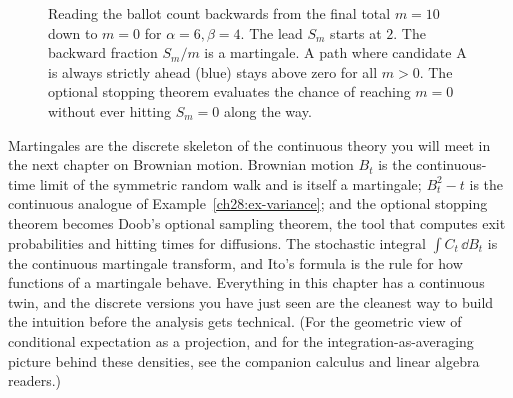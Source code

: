 \begin{figure}[H]
\centering
{}
\caption{Reading the ballot count backwards from the final total $m=10$ down to $m=0$ for $\alpha=6, \beta=4$. The lead $S_m$ starts at $2$. The backward fraction $S_m / m$ is a martingale. A path where candidate A is always strictly ahead (blue) stays above zero for all $m > 0$. The optional stopping theorem evaluates the chance of reaching $m=0$ without ever hitting $S_m = 0$ along the way.}
\label{ch28:fig-ballot}
\end{figure}


\begin{connectionbox}
Martingales are the discrete skeleton of the continuous theory you will meet in the next chapter on
Brownian motion. Brownian motion $B_t$ is the continuous-time limit of the symmetric random walk and is
itself a martingale; $B_t^2 - t$ is the continuous analogue of Example~\ref{ch28:ex-variance}; and the
optional stopping theorem becomes Doob's optional sampling theorem, the tool that computes exit
probabilities and hitting times for diffusions. The stochastic integral $\int C_t\,\dd B_t$ is the
continuous martingale transform, and Ito's formula is the rule for how functions of a martingale
behave. Everything in this chapter has a continuous twin, and the discrete versions you have just seen
are the cleanest way to build the intuition before the analysis gets technical. (For the geometric view
of conditional expectation as a projection, and for the integration-as-averaging picture behind these
densities, see the companion calculus and linear algebra readers.)
\end{connectionbox}

